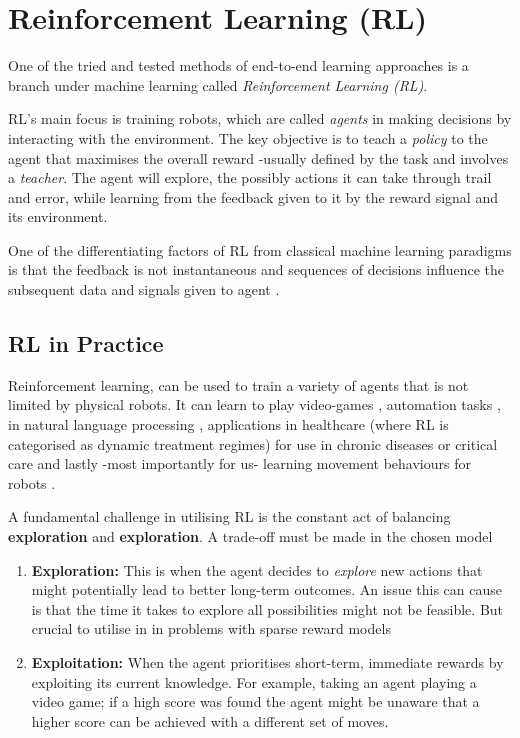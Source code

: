 \section{Reinforcement Learning (RL)}
  One of the tried and tested methods of end-to-end learning approaches is a branch under machine learning called \emph{Reinforcement Learning (RL)}. 

  RL's main focus is training robots, which are called \emph{agents} in making decisions by interacting with the environment. The key objective is to teach a \emph{policy} to the agent that maximises the overall reward -usually defined by the task and involves a \emph{teacher}. The agent will explore, the possibly actions it can take through trail and error, while learning from the feedback given to it by the reward signal and its environment.

  One of the differentiating factors of RL from classical machine learning paradigms is that the feedback is not instantaneous and sequences of decisions influence the subsequent data and signals given to agent \cite{silver2015}.

\subsection{RL in Practice}
  Reinforcement learning, can be used to train a variety of agents that is not limited by physical robots. It can learn to play video-games \cite{comi2018}, automation tasks \cite{}, in natural language processing \cite{paulus2017deepreinforcedmodelabstractive}, applications  in healthcare (where RL is categorised as dynamic treatment regimes) for use in chronic diseases or critical care \cite{yu2020reinforcementlearninghealthcaresurvey} and lastly -most importantly for us- learning movement behaviours for robots \cite{}.
  
  A fundamental challenge in utilising RL is the constant act of balancing \textbf{exploration} and \textbf{exploration}. A trade-off must be made in the chosen model 
  \begin{enumerate}
    \item \textbf{Exploration:}
    This is when the agent decides to \emph{explore} new actions that might potentially lead to better long-term outcomes. An issue this can cause is that the time it takes to explore all possibilities might not be feasible. But crucial to utilise in in problems with sparse reward models \cite{}
    \item \textbf{Exploitation:}
    When the agent prioritises short-term, immediate rewards by exploiting its current knowledge. For example, taking an agent playing a video game; if a high score was found the agent might be unaware that a higher score can be achieved with a different set of moves. 
  \end{enumerate}

